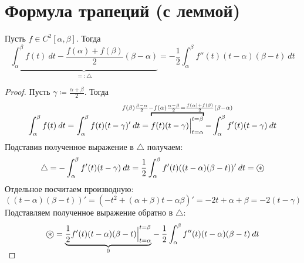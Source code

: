 \section{Формула трапеций (с леммой)}
\begin{lemma}
    Пусть $f \in C^{2}[\alpha, \beta]$. Тогда
    \begin{equation*}
        \underbrace{\int_{\alpha}^{\beta} f(t) \: dt - \frac{f(\alpha) + f(\beta)}{2}(\beta - \alpha)}_{=: \triangle} =
        -\frac{1}{2} \int_{\alpha}^{\beta} f''(t)(t - \alpha)(\beta - t) \: dt
    \end{equation*}
\end{lemma}
\begin{proof}
    Пусть $\gamma \coloneqq \frac{\alpha + \beta}{2}$. Тогда
    \begin{equation*}
            \int_{\alpha}^{\beta} f(t) \: dt = \int_{\alpha}^{\beta} f(t)(t - \gamma)'
            \: dt = \overbracket{f(t)(t - \gamma) \Big|_{t = \alpha}^{t = \beta}}^
            {\mathclap{f(\beta)\frac{\beta - \alpha}{2} - f(\alpha)\frac{\alpha - \beta}{2}
            = \frac{f(\alpha) + f(\beta)}{2}(\beta - \alpha)}}
            -\int_{\alpha}^{\beta} f'(t)(t - \gamma) \: dt
    \end{equation*}
    Подставив полученное выражение в $\triangle$ получаем:
    \begin{equation*}
            \triangle = - \int_{\alpha}^{\beta} f'(t)(t - \gamma) \: dt = \frac{1}{2}
            \int_{{\alpha}}^{{\beta}} {f'(t)((t - \alpha)(\beta - t))'} \: d{t}
            = \oast
    \end{equation*}
    Отдельное посчитаем производную:
    \begin{equation*}
            ((t - \alpha)(\beta - t))' = (-t^2 + (\alpha + \beta)t - \alpha\beta)' =
            -2t + \alpha + \beta = -2(t - \gamma)
    \end{equation*}
    Подставляем полученное выражение обратно в $\triangle$:
    \begin{equation*}
            \oast =
            \smash{\underbrace{\frac{1}{2} f'(t)(t - \alpha)(\beta - t) \Big|_{t = \alpha}^{t = \beta}}_{0}}
            - \frac{1}{2} \int_{{\alpha}}^{{\beta}} {f''(t)(t - \alpha)(\beta - t)} \: d{t}
    \end{equation*}
\end{proof}

